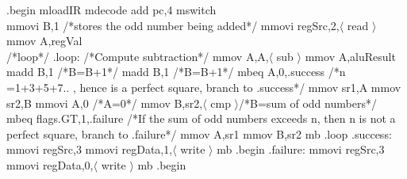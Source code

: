 \begin{ExerciseList}
.begin\newline
mloadIR\newline
mdecode\newline
add pc,4\newline
mswitch\newline \\
mmovi B,1   /*stores the odd number being added*/\newline
mmovi regSrc,2,$\langle$ read $\rangle$\newline
mmov A,regVal\newline \\
/*loop*/\newline
.loop:\newline
/*Compute subtraction*/\newline
mmov A,A,$\langle$ sub $\rangle$\newline
mmov A,aluResult\newline
madd B,1    /*B=B+1*/\newline
madd B,1    /*B=B+1*/\newline
mbeq A,0,.success   /*n =1+3+5+7.. , hence is a perfect square, branch to .success*/\newline
mmov sr1,A\newline
mmov sr2,B\newline
mmovi A,0   /*A=0*/\newline
mmov B,sr2,$\langle$ cmp $\rangle$\hspace{3mm}/*B=sum of odd numbers*/\newline
mbeq flags.GT,1,.failure  /*If the sum of odd numbers exceeds n, then n is not a perfect square, branch to .failure*/\newline
mmov A,sr1\newline
mmov B,sr2\newline
mb .loop\newline
\newline
.success:\newline
mmovi regSrc,3\newline
mmovi regData,1,$\langle$ write $\rangle$\newline
mb .begin\newline
\newline
.failure:\newline
mmovi regSrc,3\newline
mmovi regData,0,$\langle$ write $\rangle$\newline
mb .begin\newline \\ \\


\end{ExerciseList}
